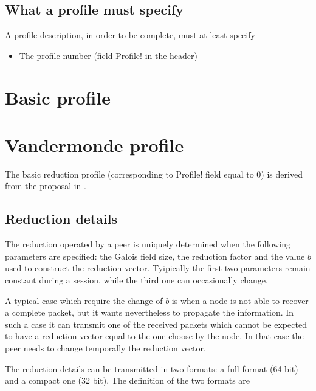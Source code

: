\documentclass{rfc}
\begin{document}
\section{What a profile must specify}
\label{sect:4.0;transport_layer}

A profile description, in order to be complete, must at least specify

\begin{itemize}
\item
The profile number (field \ttt Profile! in the header)
\end{itemize}
%

\chapter{Basic profile}
\label{chap:0;transport_layer}


\chapter{Vandermonde profile}
\label{sect:5;transport_layer}

The basic reduction profile (corresponding to \ttt Profile! field
equal to 0) is derived from the proposal in \cite{bernardini08:dcc08}.

\section{Reduction details}
\label{sub:5.0;transport_layer}

The reduction operated by a peer is uniquely determined when the
following parameters are specified: the Galois field size, the
reduction factor and the value $b$ used to construct the reduction
vector.  Tyipically the first two parameters remain constant during a
session, while the third one can occasionally change.

\begin{example}
A typical case which require the change of $b$ is when a node is not
able to recover a complete packet, but it wants nevertheless to
propagate the information.  In such a case it can transmit one of the
received packets which cannot be expected to have a reduction vector
equal to the one choose by the node.  In that case the peer needs to
change temporally the reduction vector.
\end{example}
%
The reduction details can be transmitted in two formats: a full format
(64 bit) and a compact one (32 bit).  The definition of the two 
formats are
\end{document}

